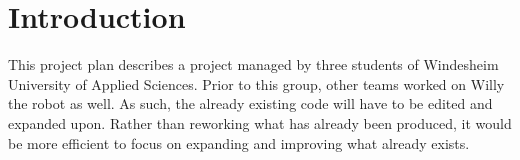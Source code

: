 \section{Introduction}
This project plan describes a project managed by three students of Windesheim University of Applied Sciences. 
Prior to this group, other teams worked on Willy the robot as well. As such, the already existing code will have to be edited and expanded upon. 
Rather than reworking what has already been produced, it would be more efficient to focus on expanding and improving what already exists.

\newpage
